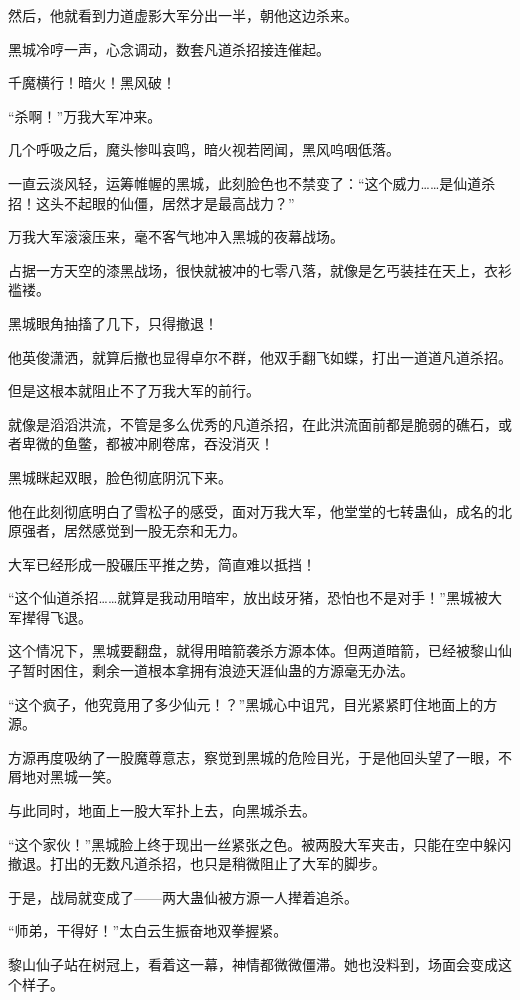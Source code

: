 \begin{this_body}
然后，他就看到力道虚影大军分出一半，朝他这边杀来。

黑城冷哼一声，心念调动，数套凡道杀招接连催起。

千魔横行！暗火！黑风破！

“杀啊！”万我大军冲来。

几个呼吸之后，魔头惨叫哀鸣，暗火视若罔闻，黑风呜咽低落。

一直云淡风轻，运筹帷幄的黑城，此刻脸色也不禁变了：“这个威力……是仙道杀招！这头不起眼的仙僵，居然才是最高战力？”

万我大军滚滚压来，毫不客气地冲入黑城的夜幕战场。

占据一方天空的漆黑战场，很快就被冲的七零八落，就像是乞丐装挂在天上，衣衫褴褛。

黑城眼角抽搐了几下，只得撤退！

他英俊潇洒，就算后撤也显得卓尔不群，他双手翻飞如蝶，打出一道道凡道杀招。

但是这根本就阻止不了万我大军的前行。

就像是滔滔洪流，不管是多么优秀的凡道杀招，在此洪流面前都是脆弱的礁石，或者卑微的鱼鳖，都被冲刷卷席，吞没消灭！

黑城眯起双眼，脸色彻底阴沉下来。

他在此刻彻底明白了雪松子的感受，面对万我大军，他堂堂的七转蛊仙，成名的北原强者，居然感觉到一股无奈和无力。

大军已经形成一股碾压平推之势，简直难以抵挡！

“这个仙道杀招……就算是我动用暗牢，放出歧牙猪，恐怕也不是对手！”黑城被大军撵得飞退。

这个情况下，黑城要翻盘，就得用暗箭袭杀方源本体。但两道暗箭，已经被黎山仙子暂时困住，剩余一道根本拿拥有浪迹天涯仙蛊的方源毫无办法。

“这个疯子，他究竟用了多少仙元！？”黑城心中诅咒，目光紧紧盯住地面上的方源。

方源再度吸纳了一股魔尊意志，察觉到黑城的危险目光，于是他回头望了一眼，不屑地对黑城一笑。

与此同时，地面上一股大军扑上去，向黑城杀去。

“这个家伙！”黑城脸上终于现出一丝紧张之色。被两股大军夹击，只能在空中躲闪撤退。打出的无数凡道杀招，也只是稍微阻止了大军的脚步。

于是，战局就变成了——两大蛊仙被方源一人撵着追杀。

“师弟，干得好！”太白云生振奋地双拳握紧。

黎山仙子站在树冠上，看着这一幕，神情都微微僵滞。她也没料到，场面会变成这个样子。


\end{this_body}
